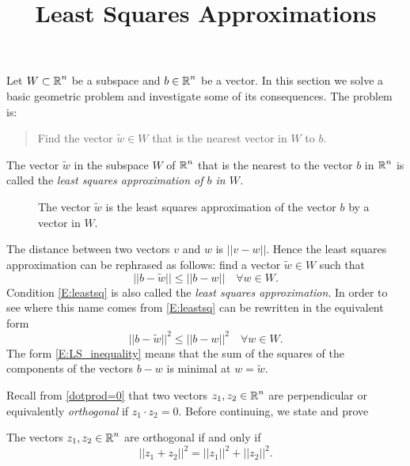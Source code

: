 \documentclass{ximera}
\title{Least Squares Approximations}
\begin{document}
\begin{abstract}
\end{abstract}
\maketitle

  \label{S:LSA}

Let $W\subset\mbox{$\mathbb{R}$}^n$ be a subspace and $b\in\mbox{$\mathbb{R}$}^n$ be a vector.  In this
section we solve a basic geometric problem and investigate some of its
consequences.  The problem is:
\begin{quote}
Find the vector $\tilde{w}\in W$ that is the nearest vector in $W$ to $b$.
\end{quote}

\begin{definition} \rm \label{D:least_squares}
The vector $\tilde{w}$ in the subspace $W$ of $\mbox{$\mathbb{R}$}^n$ that is the nearest to the 
vector $b$ in $\mbox{$\mathbb{R}$}^n$ is called the \em{least squares approximation} of 
$b$ in $W$.
\end{definition} 

\begin{figure}[htb]
        \centerline{%
        }
        \caption{The vector $\tilde{w}$ is the least squares approximation of the vector $b$ by a vector in $W$.}
        \label{F:nearest}
\end{figure}


The distance between two vectors
$v$ and $w$ is $||v-w||$.  Hence the least squares approximation 
can be rephrased as follows: find a vector $\tilde{w}\in W$ such that
\begin{equation}  \label{E:leastsq}
||b-\tilde{w}||\leq ||b-w|| \quad \forall w\in W.
\end{equation}
Condition \eqref{E:leastsq} is also called the
{\em least squares approximation}.
In order to see where this name comes from \eqref{E:leastsq} can be 
rewritten in the equivalent form
\begin{equation} \label{E:LS_inequality}
||b-\tilde{w}||^2\leq ||b-w||^2 \quad \forall w\in W.
\end{equation}
The form \eqref{E:LS_inequality} means that the sum of the squares of the
components of the vectors $b - w$ is minimal at $w = \tilde{w}$.

Recall from \eqref{dotprod=0} that two vectors $z_1,z_2\in\mbox{$\mathbb{R}$}^n$ are perpendicular 
or equivalently {\em orthogonal} if $z_1\cdot z_2 = 0$.  Before continuing, we state and prove 
\begin{lemma}   \label{L:LP}
The vectors $z_1,z_2\in\mbox{$\mathbb{R}$}^n$ are orthogonal if and only if  
\begin{equation} \label{E:LP}
||z_1+z_2||^2 = ||z_1||^2 + ||z_2||^2.
\end{equation}
\end{lemma}
\end{document}
